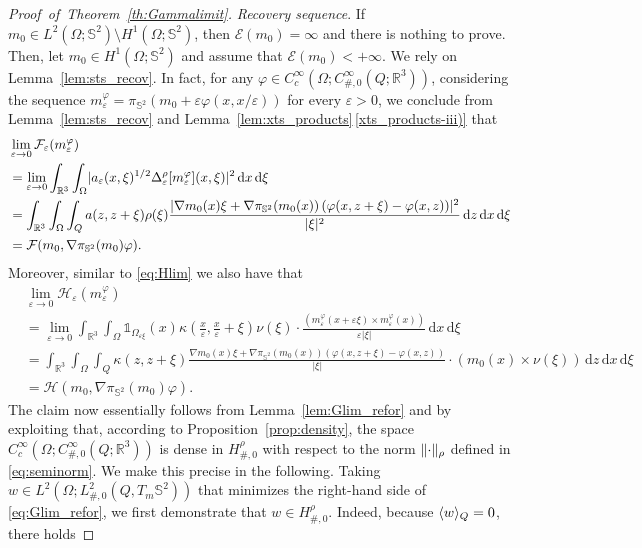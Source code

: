 \documentclass[reqno,11pt]{amsart}
\numberwithin{equation}{section}
\theoremstyle{thmlemcorr}
\numberwithin{theorem}{section}
\theoremstyle{thmlemcorr*}
\theoremstyle{defi}
\theoremstyle{remexample}
\theoremstyle{ass}
\newcommand{\R}{\mathbb{R}}
\renewcommand{\S}{\mathbb{S}}
\newcommand{\Fcal}{\mathcal{F}}
\newcommand{\Hcal}{\mathcal{H}}
\renewcommand{\epsilon}{\varepsilon}
\newcommand{\dd}{\,\mathrm{d}}
\DeclarePairedDelimiter{\abs}{\lvert}{\rvert}
\DeclarePairedDelimiter{\norm}{\lVert}{\rVert}
\DeclarePairedDelimiter{\inner}{\langle}{\rangle}
\newcommand{\1}{\mathds{1}}
\newcommand{\Om}{\Omega}
\newcommand{\veps}{\varepsilon}
\newcommand{\dl}{\,\mathrm{d}}
\begin{document}
\begin{proof}[Proof~of~Theorem~\ref{th:Gammalimit}]
\textit{Recovery sequence}. If $m_0 \in L^2(\Omega;\S^2) \setminus H^1(\Omega;\S^2)$, then $\mathcal{E}(m_0)= \infty$ and there is nothing to prove. 
Then, let $m_0 \in H^1(\Omega;\S^2)$ and assume that \(\mathcal{E}(m_0)<+ \infty\). 
We rely on Lemma~\ref{lem:sts_recov}. In fact, for any \(\varphi \in C_c^\infty(\Om; C^\infty_{\#,0}(Q;\R^3))\), considering the sequence $m_\veps^\varphi = \pi_{\S^2}(m_0+\veps \varphi(x,x/\veps))$ for every $\veps > 0$, we conclude from Lemma~\ref{lem:sts_recov} and Lemma~\ref{lem:xts_products}\,\ref{xts_products-iii)} that 
\begin{align}
    \begin{split}\label{eq:Flim_recov}
    &\lim_{\epsilon \to 0} \Fcal_\epsilon(m_\epsilon^\varphi) \\
    & = \lim_{\epsilon \to 0} \int_{\R^3} \int_\Om\abs{a_\epsilon(x,\xi)^{1/2}\Delta^\rho_\epsilon [m_\epsilon^\varphi](x,\xi)}^2\dd x\dd \xi\\
    &  =  \int_{\R^3}\int_\Om\int_Q a(z,z+\xi)\rho(\xi)\frac{\abs{\nabla m_0(x)\xi+ \nabla \pi_{\S^2}(m_0(x))\left(\varphi(x,z+\xi)-\varphi(x,z)\right)}^2}{\abs{\xi}^2}
    \dl z\dl x\dl \xi\\
    & = \mathcal{F}(m_0,\nabla \pi_{\S^2}(m_0)\varphi).
    \end{split}
\end{align}
Moreover, similar to \eqref{eq:Hlim} we also have that
\begin{align}
    &\lim_{\epsilon \to 0}\Hcal_\epsilon(m_\epsilon^\varphi)\nonumber \\
    &= \lim_{\epsilon \to 0} \int_{\R^3}\int_{\Om} \1_{\Omega_{\epsilon\xi}}(x)\kappa\left(\frac{x}{\epsilon},\frac{x}{\epsilon}+\xi\right)\nu(\xi)\cdot\frac{(m_\epsilon^\varphi(x+\epsilon\xi)\times m_\epsilon^\varphi(x))}{\epsilon|\xi|}\dd x\dd \xi\label{eq:Hlim_recov} \\
    &=\int_{\R^3}\int_\Om\int_Q \kappa(z,z+\xi)\frac{\nabla m_0(x)\xi+\nabla \pi_{\S^2}(m_0(x))\left(\varphi(x,z+\xi)-\varphi(x,z)\right)}{|\xi|}\cdot(m_0(x)\times \nu(\xi)) \dd z \dd x \dd \xi\nonumber\\
    &= \mathcal{H}(m_0,\nabla \pi_{\S^2}(m_0)\varphi).\nonumber
\end{align}
The claim now essentially follows from Lemma~\ref{lem:Glim_refor} and by exploiting that, according to Proposition~\ref{prop:density}, the space \(C_c^\infty(\Om; C^\infty_{\#,0}(Q;\R^3))\) is dense in \(H^\rho_{\#,0}\) with respect to the norm \(\norm{\cdot}_\rho\) defined in \eqref{eq:seminorm}. We make this precise in the following. Taking \(w\in L^2(\Om;L^2_{\#,0}(Q,T_{m}\S^2))\) that minimizes the right-hand side of \eqref{eq:Glim_refor}, we first demonstrate that \(w\in H^\rho_{\#,0}\). Indeed, because \(\inner{w}_{Q}=0\), there holds 

\end{proof}
\end{document}
